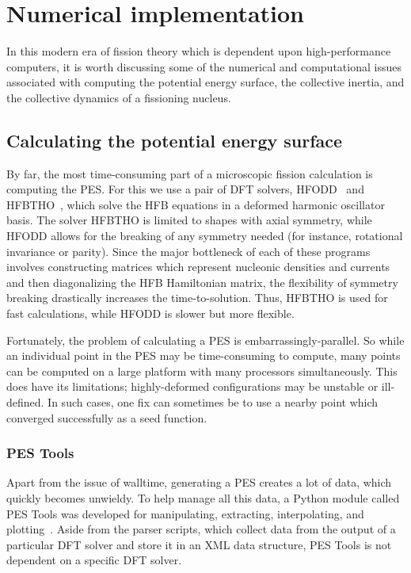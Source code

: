 \chapter{Numerical implementation}\label{chap:Numerical}

In this modern era of fission theory which is dependent upon high-performance computers, it is worth discussing some of the numerical and computational issues associated with computing the potential energy surface, the collective inertia, and the collective dynamics of a fissioning nucleus.

\section{Calculating the potential energy surface}
By far, the most time-consuming part of a microscopic fission calculation is computing the PES. For this we use a pair of DFT solvers, HFODD~\cite{Schunck2017} and HFBTHO~\cite{Perez2017}, which solve the HFB equations in a deformed harmonic oscillator basis. The solver HFBTHO is limited to shapes with axial symmetry, while HFODD allows for the breaking of any symmetry needed (for instance, rotational invariance or parity). Since the major bottleneck of each of these programs involves constructing matrices which represent nucleonic densities and currents and then diagonalizing the HFB Hamiltonian matrix, the flexibility of symmetry breaking drastically increases the time-to-solution. Thus, HFBTHO is used for fast calculations, while HFODD is slower but more flexible.

Fortunately, the problem of calculating a PES is embarrassingly-parallel. So while an individual point in the PES may be time-consuming to compute, many points can be computed on a large platform with many processors simultaneously. This does have its limitations; highly-deformed configurations may be unstable or ill-defined. In such cases, one fix can sometimes be to use a nearby point which converged successfully as a seed function.


\subsection{PES Tools}
Apart from the issue of walltime, generating a PES creates a lot of data, which quickly becomes unwieldy. To help manage all this data, a Python module called PES Tools was developed for manipulating, extracting, interpolating, and plotting~\cite{PES_tools}. Aside from the parser scripts, which collect data from the output of a particular DFT solver and store it in an XML data structure, PES Tools is not dependent on a specific DFT solver.


